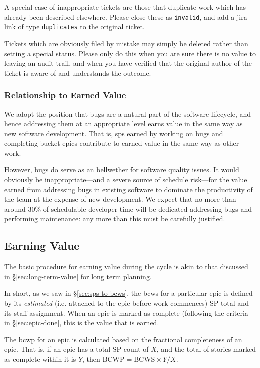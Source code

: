 A special case of inappropriate tickets are those that duplicate work which has already been described elsewhere.
Please close these as \texttt{invalid}, and add a \gls{jira} link of type \texttt{duplicates} to the original ticket.

Tickets which are obviously filed by mistake may simply be deleted
rather than setting a special status. Please only do this when you are
sure there is no value to leaving an audit trail, and when you have
verified that the original author of the ticket is aware of and
understands the outcome.

\subsubsection{Relationship to Earned Value}

We adopt the position that bugs are a natural part of the software
lifecycle, and hence addressing them at an appropriate level earns value
in the same way as new software development. That is, \glspl{sp} earned by
working on bugs and completing bucket \glspl{epic} contribute to earned value
in the same way as other work.

However, bugs do serve as an bellwether for software quality issues.
It would obviously be inappropriate---and a severe source of schedule \gls{risk}---for the value earned from addressing bugs in existing software to dominate the productivity of the team at the expense of new development.
We expect that no more than around 30\% of schedulable developer time will be dedicated addressing bugs and performing maintenance: any more than this must be carefully justified.

\subsection{Earning Value}
\label{sec:cycle-value}

The basic procedure for earning value during the \gls{cycle} is akin to that discussed in \S\ref{sec:long-term-value} for long term planning.

In short, as we saw in \S\ref{sec:sps-to-bcws}, the \gls{bcws} for a particular \gls{epic} is defined by its \emph{estimated} (i.e.  attached to the \gls{epic} before work commences) SP total and its staff assignment.
When an \gls{epic} is marked as complete (following the criteria in \S\ref{sec:epic-done}, this is the value that is earned.

The \gls{bcwp} for an \gls{epic} is calculated based on the fractional completeness of an \gls{epic}. That is, if an \gls{epic} has a total SP count of \(X\), and the total of stories marked as complete within it is \(Y\), then \(\mathrm{BCWP} = \mathrm{BCWS} \times Y / X\).

